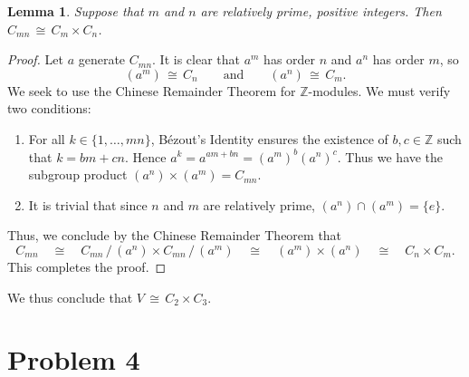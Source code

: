 \documentclass[11pt]{article}
\newtheorem{lemma}{Lemma}
\begin{document}
\begin{adjustwidth}{0.5cm}{}
  \begin{lemma}
    Suppose that $m$ and $n$ are relatively prime, positive integers. Then $C_{mn} \, \cong \, C_{m} \times C_{n}$.
  \end{lemma}
  \begin{proof}
    Let $a$ generate $C_{mn}$. It is clear that $a^{m}$ has order $n$ and $a^{n}$ has order $m$, so 
    \[
      (a^{m}) \, \cong \, C_{n} \qquad \text{and} \qquad (a^{n}) \, \cong \, C_{m}.
    \]
    We seek to use the Chinese Remainder Theorem for $\mathbb{Z}$-modules. We must verify two conditions:
    \begin{enumerate}
      \item For all $k \in \{ 1, \ldots, mn \}$, Bézout's Identity ensures the existence of $b, c \in \mathbb{Z}$ such that $k = bm + cn$. Hence $a^{k} = a^{am + bn} = (a^{m})^{b}(a^{n})^{c}$. Thus we have the subgroup product $(a^{n}) \times (a^{m}) = C_{mn}$.
      \item It is trivial that since $n$ and $m$ are relatively prime, $(a^{n}) \cap (a^{m}) = \{ e \}$.
    \end{enumerate}
    Thus, we conclude by the Chinese Remainder Theorem that
    \[
      C_{mn} \quad \cong \quad C_{mn} \, / \, (a^{n}) \times C_{mn} \, / \, (a^{m}) \quad \cong \quad (a^{m}) \times (a^{n}) \quad \cong \quad C_{n} \times C_{m}.
    \]
    This completes the proof.
  \end{proof}
\end{adjustwidth}

We thus conclude that $\boxed{V \, \cong \, C_{2} \times C_{3}}$.

\newpage


\section{Problem 4}
\end{document}
